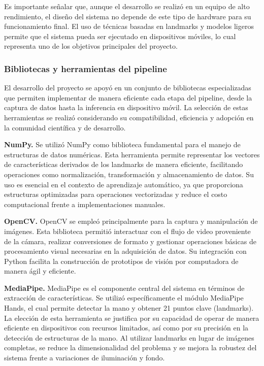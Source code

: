 	Es importante señalar que, aunque el desarrollo se realizó en un equipo de alto rendimiento, el diseño del sistema no depende de este tipo de hardware para su funcionamiento final. El uso de técnicas basadas en landmarks y modelos ligeros permite que el sistema pueda ser ejecutado en dispositivos móviles, lo cual representa uno de los objetivos principales del proyecto.
	
	\subsubsection{Bibliotecas y herramientas del pipeline}
	
	El desarrollo del proyecto se apoyó en un conjunto de bibliotecas especializadas que permiten implementar de manera eficiente cada etapa del pipeline, desde la captura de datos hasta la inferencia en dispositivo móvil. La selección de estas herramientas se realizó considerando su compatibilidad, eficiencia y adopción en la comunidad científica y de desarrollo.
	
	\textbf{NumPy.}  
	Se utilizó NumPy como biblioteca fundamental para el manejo de estructuras de datos numéricas. Esta herramienta permite representar los vectores de características derivados de los landmarks de manera eficiente, facilitando operaciones como normalización, transformación y almacenamiento de datos. Su uso es esencial en el contexto de aprendizaje automático, ya que proporciona estructuras optimizadas para operaciones vectorizadas y reduce el costo computacional frente a implementaciones manuales.
	
	\textbf{OpenCV.}  
	OpenCV se empleó principalmente para la captura y manipulación de imágenes. Esta biblioteca permitió interactuar con el flujo de video proveniente de la cámara, realizar conversiones de formato y gestionar operaciones básicas de procesamiento visual necesarias en la adquisición de datos. Su integración con Python facilita la construcción de prototipos de visión por computadora de manera ágil y eficiente.
	
	\textbf{MediaPipe.}  
	MediaPipe es el componente central del sistema en términos de extracción de características. Se utilizó específicamente el módulo MediaPipe Hands, el cual permite detectar la mano y obtener 21 puntos clave (landmarks). La elección de esta herramienta se justifica por su capacidad de operar de manera eficiente en dispositivos con recursos limitados, así como por su precisión en la detección de estructuras de la mano. Al utilizar landmarks en lugar de imágenes completas, se reduce la dimensionalidad del problema y se mejora la robustez del sistema frente a variaciones de iluminación y fondo.
	
